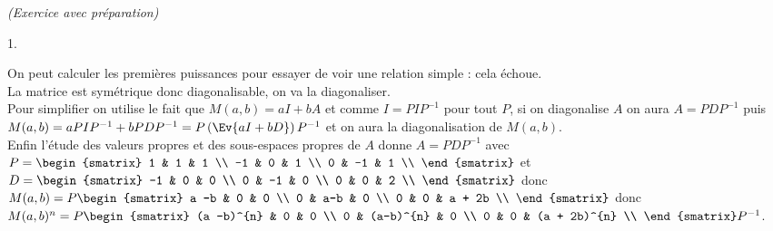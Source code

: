 \documentclass[11pt]{article}%
\begin{document}
\begin{exercice}{\it (Exercice avec préparation)}
\begin{noliste}{1.}
 \item On peut calculer les premières puissances pour essayer de voir
une relation simple : cela échoue. \\
 La matrice est symétrique donc diagonalisable, on va la diagonaliser.
\\
 Pour simplifier on utilise le fait que $M(a,b) = a I + b A$ et comme
$I = P I P^{-1}$ pour tout $P$, si on diagonalise $A$ on aura $A = P D
P^{-1}$ puis $M(a,b) = a P I P^{-1} + b P D P^{-1} = P \left(\Ev{ a I +
b D}\right) P^{-1}$ et on aura la diagonalisation de $M(a,b)$. \\
 Enfin l'étude des valeurs propres et des sous-espaces propres de $A$
donne $A = P D P^{-1}$ avec \\
$P = \begin{smatrix}
1 & 1 & 1 \\
-1 & 0 & 1 \\
0 & -1 & 1 \\
\end{smatrix}
$ et $D = \begin{smatrix}
-1 & 0 & 0 \\
0 & -1 & 0 \\
0 & 0 & 2 \\
\end{smatrix}
$ donc $M(a,b) = P \begin{smatrix}
a -b & 0 & 0 \\
0 & a-b & 0 \\
0 & 0 & a + 2b \\
\end{smatrix}
$ donc $M(a,b)^{n} = P \begin{smatrix}
(a -b)^{n} & 0 & 0 \\
0 & (a-b)^{n} & 0 \\
0 & 0 & (a + 2b)^{n} \\
\end{smatrix}
P^{-1}$.

 \end{noliste}
 \end{exercice}

 \newpage
\end{document}
